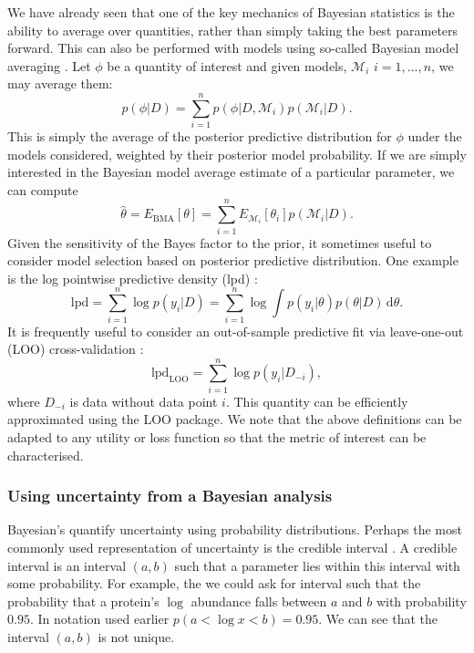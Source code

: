 \documentclass[12pt,english]{article}
\begin{document}
We have already seen that one of the key mechanics of Bayesian statistics is the ability to average over quantities, rather than simply taking the best parameters forward. This can also be performed with models using so-called Bayesian model averaging \citep{Raftery::1997}. Let $\phi$ be a quantity of interest and given models, $\mathcal{M}_i$ $i = 1,..., n$, we may average them:
\begin{equation}
p(\phi|D) = \sum_{i = 1}^{n}p(\phi|D, \mathcal{M}_i)p(\mathcal{M}_i|D).
\end{equation}
This is simply the average of the posterior predictive distribution for $\phi$ under the models considered, weighted by their posterior model probability. If we are simply interested in the Bayesian model average estimate of a particular parameter, we can compute
\begin{equation}
\hat{\theta} = E_{\text{BMA}}[\theta] = \sum_{i = 1}^{n}E_{\mathcal{M}_i}[\theta_i] p(\mathcal{M}_i|D).
\end{equation}
Given the sensitivity of the Bayes factor to the prior, it sometimes useful to consider model selection based on posterior predictive distribution. One example is the log pointwise predictive density (lpd) \citep{Vehtari::2017}:
\begin{equation}
\text{lpd} = \sum_{i = 1}^n \log p(y_i|D) = \sum_{i = 1}^n \log \int p(y_i|\theta)p(\theta|D)\, \text{d}\theta.
\end{equation}
It is frequently useful to consider an out-of-sample predictive fit via leave-one-out (LOO) cross-validation \citep{Vehtari::2017}:
\begin{equation}
\text{lpd}_\text{LOO} = \sum_{i = 1}^{n}\log p(y_i| D_{-i}),
\end{equation}
where $D_{-i}$ is data without data point $i$. This quantity can be efficiently approximated using the LOO package. We note that the above definitions can be adapted to any utility or loss function so that the metric of interest can be characterised.


\subsubsection{Using uncertainty from a Bayesian analysis}
Bayesian's quantify uncertainty using probability distributions. Perhaps the most commonly used representation of uncertainty is the credible interval \citep{Gelman::1995}. A credible interval is an interval $(a,b)$ such that a parameter lies within this interval with some probability. For example, the we could ask for interval such that the probability that a protein's $\log$ abundance falls between $a$ and $b$ with probability $0.95$. In notation used earlier $p(a < \log x < b) = 0.95$. We can see that the interval $(a,b)$ is not unique. 
\end{document}
